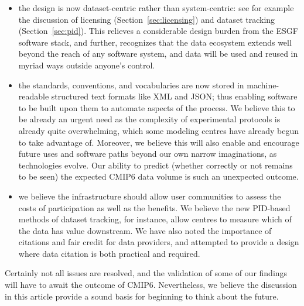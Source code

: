 \documentclass[gmd,manuscript]{copernicus}
\newcommand{\secref}[1] {\mbox{Section  \ref{sec:#1}}}
\begin{document}
\begin{itemize}
\item the design is now dataset-centric rather than system-centric:
  see for example the discussion of licensing (\secref{licensing}) and
  dataset tracking (\secref{pid}). This relieves a considerable design
  burden from the ESGF software stack, and further, recognizes that the
  data ecosystem extends well beyond the reach of any software system,
  and data will be used and reused in myriad ways outside anyone's
  control.
\item the standards, conventions, and vocabularies are now stored in
  machine-readable structured text formats like XML and JSON; thus
  enabling software to be built upon them to automate aspects of the
  process. We believe this to be already an urgent need as the
  complexity of experimental protocols is already quite overwhelming,
  which some modeling centres have already begun to take advantage of.
  Moreover, we believe this will also enable and encourage future uses
  and software paths beyond our own narrow imaginations, as
  technologies evolve. Our ability to predict (whether correctly or
  not remains to be seen) the expected CMIP6 data volume is such an
  unexpected outcome.
\item we believe the infrastructure should allow user communities to
  assess the costs of participation as well as the benefits. We
  believe the new PID-based methods of dataset tracking, for instance,
  allow centres to measure which of the data has value downstream. We
  have also noted the importance of citations and fair credit for data
  providers, and attempted to provide a design where data citation is
  both practical and required.
\end{itemize}


Certainly not all issues are resolved, and the validation of some of
our findings will have to await the outcome of CMIP6. Nevertheless, we
believe the discussion in this article provide a sound basis for
beginning to think about the future.
\end{document}
